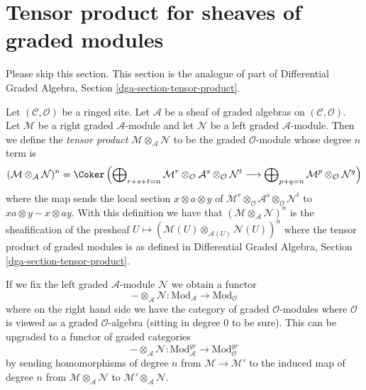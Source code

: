 \section{Tensor product for sheaves of graded modules}
\label{section-tensor-product}

\noindent
Please skip this section. This section is the analogue of part of
Differential Graded Algebra, Section \ref{dga-section-tensor-product}.

\medskip\noindent
Let $(\mathcal{C}, \mathcal{O})$ be a ringed site. Let $\mathcal{A}$
be a sheaf of graded algebras on $(\mathcal{C}, \mathcal{O})$.
Let $\mathcal{M}$ be a right graded $\mathcal{A}$-module
and let $\mathcal{N}$ be a left graded $\mathcal{A}$-module.
Then we define the {\it tensor product}
$\mathcal{M} \otimes_\mathcal{A} \mathcal{N}$
to be the graded $\mathcal{O}$-module whose degree $n$ term is
$$
(\mathcal{M} \otimes_\mathcal{A} \mathcal{N})^n =
\Coker\left(
\bigoplus\nolimits_{r + s + t = n} \mathcal{M}^r \otimes_\mathcal{O}
\mathcal{A}^s \otimes_\mathcal{O} \mathcal{N}^t
\longrightarrow
\bigoplus\nolimits_{p + q = n} \mathcal{M}^p \otimes_\mathcal{O} \mathcal{N}^q
\right)
$$
where the map sends the local section $x \otimes a \otimes y$
of $\mathcal{M}^r \otimes_\mathcal{O} \mathcal{A}^s
\otimes_\mathcal{O} \mathcal{N}^t$ to
$xa \otimes y - x \otimes ay$.
With this definition we have that
$(\mathcal{M} \otimes_\mathcal{A} \mathcal{N})^n$
is the sheafification of the presheaf
$U \mapsto (\mathcal{M}(U) \otimes_{\mathcal{A}(U)} \mathcal{N}(U))^n$
where the tensor product of graded modules is as defined in
Differential Graded Algebra, Section \ref{dga-section-tensor-product}.

\medskip\noindent
If we fix the left graded $\mathcal{A}$-module $\mathcal{N}$
we obtain a functor
$$
- \otimes_\mathcal{A} \mathcal{N} :
\text{Mod}_\mathcal{A}
\longrightarrow
\text{Mod}_\mathcal{O}
$$
where on the right hand side we have the category of graded
$\mathcal{O}$-modules where $\mathcal{O}$ is viewed as a
graded $\mathcal{O}$-algebra (sitting in degree $0$ to be sure).
This can be upgraded to a functor of graded categories
$$
- \otimes_\mathcal{A} \mathcal{N} :
\text{Mod}^{gr}_\mathcal{A}
\longrightarrow
\text{Mod}^{gr}_\mathcal{O}
$$
by sending homomorphisms of degree $n$ from $\mathcal{M} \to \mathcal{M}'$
to the induced map of degree $n$ from
$\mathcal{M} \otimes_\mathcal{A} \mathcal{N}$ to
$\mathcal{M}' \otimes_\mathcal{A} \mathcal{N}$.






